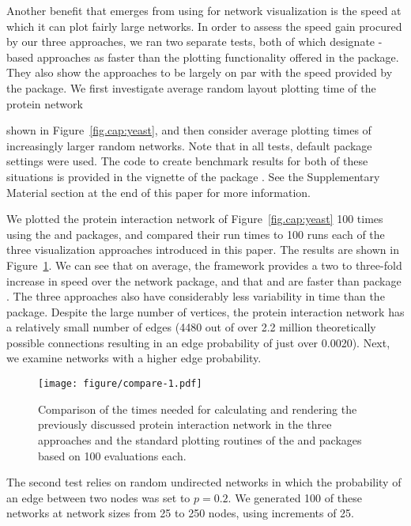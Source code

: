 Another benefit that emerges from using  for network visualization is the speed at which it can plot fairly large networks. In order to assess the speed gain procured by our three approaches, we ran two separate tests, both of which designate -based approaches as faster than the plotting functionality offered in the  package. They also show the  approaches to be largely on par with the speed provided by the  package. We first investigate average random layout plotting time of the protein network 

shown in Figure~\ref{fig.cap:yeast}, and then consider average plotting times of increasingly larger random networks. Note that in all tests, default package settings were used. The code to create benchmark results for both of these situations is provided in the vignette of the package  \citep{ggCompNet}. See the Supplementary Material section at the end of this paper for more information. 

We plotted the protein interaction network of Figure~\ref{fig.cap:yeast} 100 times using the  and  packages, and compared their run times to 100 runs each of the three visualization approaches introduced in this paper. The results are shown in Figure~\ref{fig:timings}. We can see that on average, the  framework provides a two to three-fold increase in speed over the network package, and that  and  are faster than package . The three  approaches also have considerably less variability in time than the  package.
Despite the large number of vertices, the protein interaction network has a relatively small number of edges (4480 out of over 2.2 million theoretically possible connections resulting in an edge probability of just over 0.0020). Next, we examine networks with a higher edge probability.

\begin{figure}[b]
\centering

\texttt{[image: figure/compare-1.pdf]}
\caption{\label{fig:timings} Comparison of the times needed for calculating and rendering the previously discussed protein interaction network in the three  approaches and the standard plotting routines  of the  and  packages based on 100 evaluations each.  }
\end{figure}

The second test relies on random undirected networks in which the probability of an edge between two nodes was set to $p = 0.2$. We generated 100 of these networks at network sizes from 25 to 250 nodes, using increments of 25.

